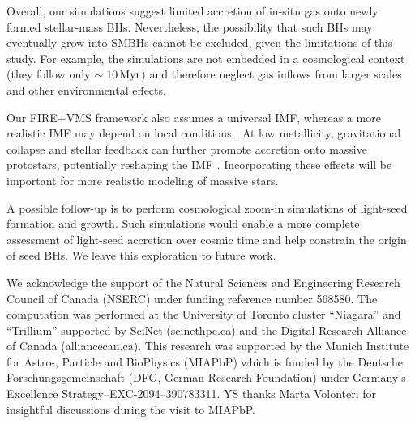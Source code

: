 \documentclass[twocolumn]{aastex631}
\begin{document}
Overall, our simulations suggest limited accretion of in-situ gas onto newly formed stellar-mass BHs. Nevertheless, the possibility that such BHs may eventually grow into SMBHs cannot be excluded, given the limitations of this study. For example, the simulations are not embedded in a cosmological context (they follow only $\sim 10\,\rm Myr$) and therefore neglect gas inflows from larger scales and other environmental effects.

Our FIRE+VMS framework also assumes a universal IMF, whereas a more realistic IMF may depend on local conditions \citep{GuszejnovHopkinsMa_2017MNRAS.472.2107G}. At low metallicity, gravitational collapse and stellar feedback can further promote accretion onto massive protostars, potentially reshaping the IMF \citep{BegelmanVolonteriRees_2006MNRAS.370..289B,ChonOmukai_2020MNRAS.494.2851C,ChonOmukai_2025MNRAS.539.2561C}. Incorporating these effects will be important for more realistic modeling of massive stars.

A possible follow-up is to perform cosmological zoom-in simulations of light-seed formation and growth. Such simulations would enable a more complete assessment of light-seed accretion over cosmic time and help constrain the origin of seed BHs. We leave this exploration to future work.






\begin{acknowledgments}

We acknowledge the support of the Natural Sciences and Engineering Research Council of Canada (NSERC) under funding reference number 568580.
The computation was performed at the University of Toronto cluster ``Niagara'' and ``Trillium'' supported by SciNet (scinethpc.ca) and the Digital Research Alliance of Canada (alliancecan.ca). This research was supported by the Munich Institute for Astro-, Particle and BioPhysics (MIAPbP) which is funded by the Deutsche Forschungsgemeinschaft (DFG, German Research Foundation) under Germany's Excellence Strategy--EXC-2094--390783311. YS thanks Marta Volonteri for insightful discussions during the visit to MIAPbP.
\end{acknowledgments}
\end{document}
